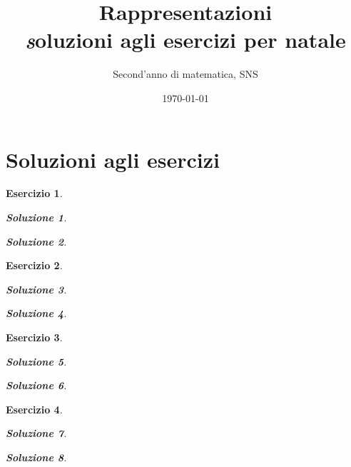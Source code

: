 \documentclass[a4paper]{article}
\title{Rappresentazioni \\ { \textit soluzioni agli esercizi per natale }}
\author{Second'anno di matematica, SNS}
\date{\today}
\theoremstyle{break}
\newtheorem{ex}{{ \Large Esercizio} }
\theoremstyle{plain}
\newtheorem{sol}{Soluzione}[ex]
\begin{document}
\maketitle

\section*{Soluzioni agli esercizi}

\begin{ex} 


\begin{sol} 

\end{sol}

\begin{sol}

\end{sol}


\end{ex}

\begin{ex}


\begin{sol}

\end{sol}

\begin{sol}

\end{sol}


\end{ex}

\begin{ex}


\begin{sol}

\end{sol}

\begin{sol}

\end{sol}


\end{ex}

\begin{ex}


\begin{sol}

\end{sol}

\begin{sol}

\end{sol}


\end{ex}
\end{document}
